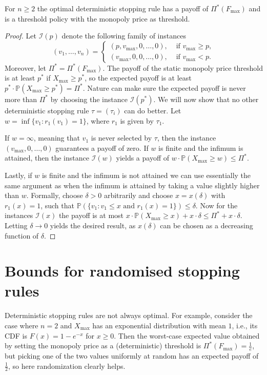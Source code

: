 \documentclass[11pt,a4paper]{article}
\numberwithin{equation}{section}
\begin{document}
\begin{theorem}
For $n\ge 2$ the optimal deterministic stopping rule has a payoff of $\Pi^*(F_{\max})$ and is a threshold policy with the monopoly price as threshold.
\label{thm:monopoly_worstcase}
\end{theorem}
\begin{proof}
    Let $\mathcal{I}(p)$ denote the following family of instances
$$
(v_1,\dots,v_n) = 
\begin{cases}
    (p,v_{\max},0,\dots,0), & \text{ if } v_{\max} \geq p,\\
(v_{\max},0,0,\dots,0),& \text{ if } v_{\max} < p.
\end{cases}
$$
Moreover, let $\Pi^*=\Pi^*(F_{\max})$.
The payoff of the static monopoly price threshold is at least $p^*$ if $X_{\max}\ge p^*$, so the expected payoff is at least $p^*\cdot\mathbb{P}(X_{\max}\ge p^*)=\Pi^*$. Nature can make sure the expected payoff is never more than $\Pi^*$ by choosing the instance $\mathcal{I}(p^*)$.
We will now show that no other deterministic stopping rule $\tau = (\tau_i)$ can do better. Let $w=\inf\{v_1:r_1(v_1)=1\}$, where $r_1$ is given by $\tau_1$. 

If $w=\infty$, meaning that $v_1$ is never selected by $\tau$, then the instance $(v_{\max},0,\dots,0)$ guarantees a payoff of zero. If $w$ is finite and the infimum is attained, then the instance $\mathcal{I}(w)$ yields a payoff of $w\cdot\mathbb{P}(X_{\max}\ge w)\le \Pi^*$. 

Lastly, if $w$ is finite and the infimum is not attained we can use essentially the same argument as when the infimum is attained by taking a value slightly higher than $w$. 
Formally, choose $\delta>0$ arbitrarily and choose $x=x(\delta)$ with $r_1(x)=1$, such that $\mathbb{P}(\{v_1:v_1\le x\text{ and }r_1(x)=1\})\le\delta$. Now for the instances $\mathcal{I}(x)$ the payoff is at most $x\cdot\mathbb{P}(X_{\max}\ge x)+x\cdot\delta\le\Pi^*+x\cdot \delta$. Letting $\delta\to 0$ yields the desired result, as $x(\delta)$ can be chosen as a decreasing function of $\delta$. 
\end{proof}

\section{Bounds for randomised stopping rules}
\label{sec:first_bounds}
Deterministic stopping rules are not always optimal.
For example, consider the case where $n=2$ and $X_{\max}$ has an exponential distribution with mean $1$, i.e., its CDF is $F(x) = 1 - e^{-x}$ for $x \geq 0$. Then the worst-case expected value obtained by setting the monopoly price as a (deterministic) threshold is $\Pi^*(F_{\max})=\frac{1}{e}$, but picking 
one of the two values uniformly at random has an expected payoff of $\frac{1}{2}$, so here randomization clearly helps.
\end{document}

